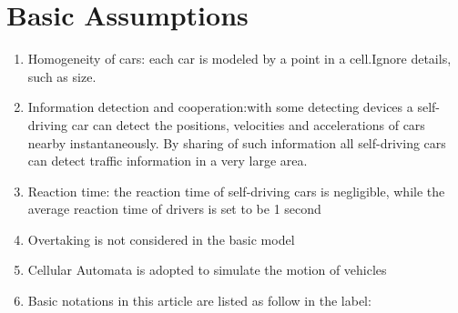 \documentclass{icmmcm}
\begin{document}
\section{Basic Assumptions}
\begin{enumerate}
\item Homogeneity of cars: each car is modeled by a point in a cell.Ignore details, such as size.
\item Information detection and cooperation:with some detecting devices a self-driving car can detect the positions, velocities and accelerations of cars nearby instantaneously. By sharing of such information all self-driving cars can detect traffic information in a very large area. %
\item Reaction time: the reaction time of self-driving cars is negligible, while the average reaction time of drivers is set to be 1 second %
\item Overtaking is not considered in the basic model
\item Cellular Automata is adopted to simulate the motion of vehicles
\item Basic notations in this article are listed as follow in the label:


\end{enumerate}
\end{document}
